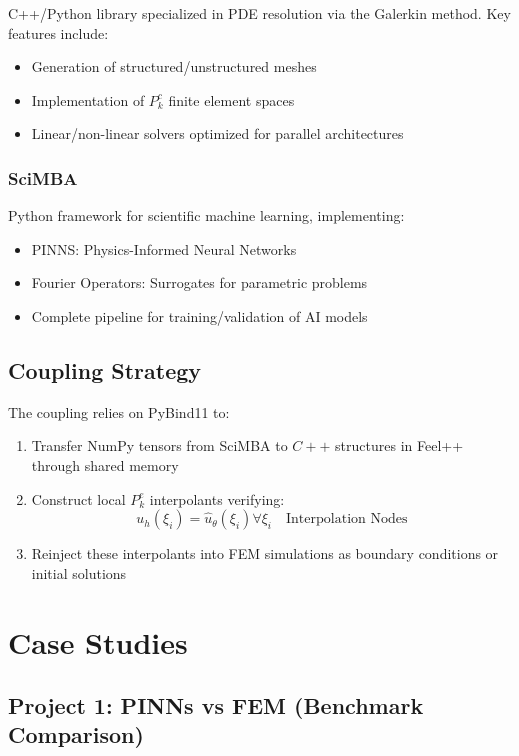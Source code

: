 \documentclass{article}
\begin{document}
C++/Python library specialized in PDE resolution via the Galerkin method. Key features include:

\begin{itemize}
\item Generation of structured/unstructured meshes
\item Implementation of $P_{k}^{c}$ finite element spaces
\item Linear/non-linear solvers optimized for parallel architectures
\end{itemize}

\subsubsection{SciMBA}

Python framework for scientific machine learning, implementing:

\begin{itemize}
\item PINNS: Physics-Informed Neural Networks
\item Fourier Operators: Surrogates for parametric problems
\item Complete pipeline for training/validation of AI models
\end{itemize}

\subsection{Coupling Strategy}

The coupling relies on PyBind11 to:
\begin{enumerate}
    \item Transfer NumPy tensors from SciMBA to $C++$ structures in Feel++ through shared memory
    \item Construct local $P_{k}^{e}$ interpolants verifying:
    $$u_{h}(\xi_{i})=\hat{u}_{\theta}(\xi_{i})\forall\xi_{i} \quad \text{Interpolation Nodes}$$
    \item Reinject these interpolants into FEM simulations as boundary conditions or initial solutions
\end{enumerate}

\section{Case Studies}

\subsection{Project 1: PINNs vs FEM (Benchmark Comparison)}
\end{document}
